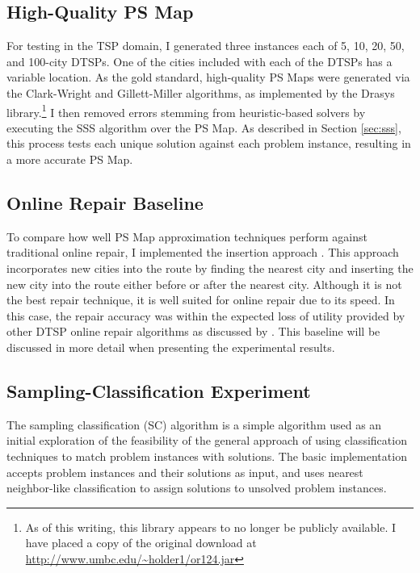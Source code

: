 \subsection{High-Quality PS Map} For testing in the TSP domain, I generated three instances each of 5, 10, 20, 50, and 100-city DTSPs.  One of the cities included with each of the DTSPs has a  variable location.  As the gold standard, high-quality PS Maps were generated via the Clark-Wright \citep{clarke64scheduling} and Gillett-Miller \citep{gillett74heuristic} algorithms, as implemented by the Drasys library.\footnote{As of this writing, this library appears to no longer be publicly available.  I have placed a copy of the original download at  \url{http://www.umbc.edu/~holder1/or124.jar}}  I then removed errors stemming from heuristic-based solvers by executing the SSS algorithm over the PS Map.  As described in Section \ref{sec:sss}, this process tests each unique solution against each problem instance, resulting in a more accurate PS Map.  


\subsection{Online Repair Baseline} To compare how well PS Map approximation techniques perform against traditional online repair, I implemented the insertion approach \citep{psaraftis88dynamic}.  This approach incorporates new cities into the route by finding the nearest city and inserting the new city into the route either before or after the nearest city.  Although it is not the best repair technique, it is well suited for online repair due to its speed.  In this case, the repair accuracy was within the expected loss of utility provided by other  DTSP online repair algorithms as discussed by \citeauthor{larsen2000dvrp}.  This baseline will be discussed in more detail when presenting the experimental results.

\subsection{Sampling-Classification Experiment}

The sampling classification (SC) algorithm is a simple algorithm used as an initial exploration of the feasibility of the general approach of using classification techniques to match problem instances with solutions.  The basic implementation accepts problem instances and their solutions as input, and uses nearest neighbor-like classification to assign solutions to unsolved problem instances.


